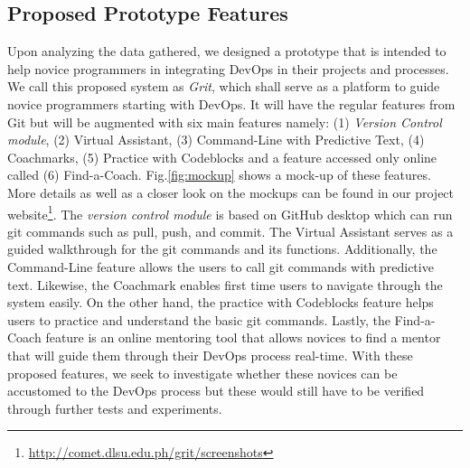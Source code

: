 \documentclass{sigchi}
\begin{document}
\subsection{Proposed Prototype Features}
Upon analyzing the data gathered, we designed a prototype that is intended to help novice programmers in integrating DevOps in their projects and processes. We call this proposed system as \textit{Grit}, which shall serve as a platform to guide novice programmers starting with DevOps. It will have the regular features from Git but will be augmented with six main features namely: (1) \textit{Version Control module}, (2) Virtual Assistant, (3) Command-Line with Predictive Text, (4) Coachmarks, (5) Practice with Codeblocks and a feature accessed only online called (6) Find-a-Coach. Fig.\ref{fig:mockup} shows a mock-up of these features. More details as well as a closer look on the mockups can be found in our project website\footnote{\url{http://comet.dlsu.edu.ph/grit/screenshots}}. The \textit{version control module} is based on GitHub desktop which can run git commands such as pull, push, and commit. The Virtual Assistant serves as a guided walkthrough for the git commands and its functions. Additionally, the Command-Line feature allows the users to call git commands with predictive text. Likewise, the Coachmark enables first time users to navigate through the system easily. On the other hand, the practice with Codeblocks feature helps users to practice and understand the basic git commands. Lastly, the Find-a-Coach feature is an online mentoring tool that allows novices to find a mentor that will guide them through their DevOps process real-time. With these proposed features, we seek to investigate whether these novices can be accustomed to the DevOps process but these would still have to be verified through further tests and experiments. 

\end{document}
